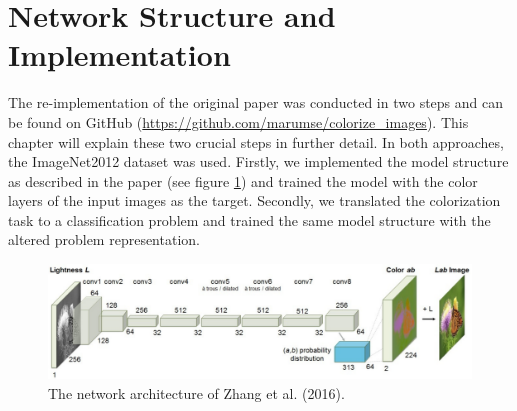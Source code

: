 \documentclass[12pt,letterpaper]{article}
\begin{document}
\section{Network Structure and Implementation}
The re-implementation of the original paper \citep{Zhang.2016} was conducted in two steps and can be found on GitHub (\url{https://github.com/marumse/colorize_images}). This chapter will explain these two crucial steps in further detail. In both approaches, the ImageNet2012 dataset was used. Firstly, we implemented the model structure as described in the paper (see figure \ref{network}) and trained the model with the color layers of the input images as the target. Secondly, we translated the colorization task to a classification problem and trained the same model structure with the altered problem representation.
\begin{figure}[ht]
	\centering
	\includegraphics[width=1.0\textwidth]{layer.png}
	\caption{The network architecture of Zhang et al. (2016). }
	\label{network}
\end{figure}
\end{document}
